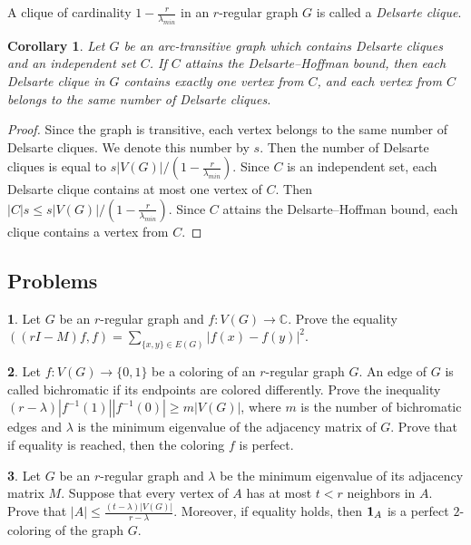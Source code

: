 \documentclass[11pt]{article}
\newtheorem{corollary}{Corollary}[section]
\theoremstyle{definition}
\newtheorem{exercise}{\quad}
\begin{document}
A clique of cardinality $1-\frac{r}{\lambda_{min}}$ in an
$r$-regular graph $G$ is called a {\sl  Delsarte clique}.

\begin{corollary}
Let $G$ be an arc-transitive graph which contains Delsarte cliques and
 an independent set $C$. If  $C$ attains the Delsarte--Hoffman bound,  then each Delsarte clique in $G$ contains exactly one vertex
from $C$, and each vertex from $C$ belongs to the same number
of Delsarte cliques.
\end{corollary}
\begin{proof}
Since the graph is transitive, each vertex belongs to the same
number of Delsarte cliques.
 We denote this number by $s$.  Then
the number of Delsarte cliques is equal to
$s|V(G)|/(1-\frac{r}{\lambda_{min}})$.
 Since $C$ is an independent set, each Delsarte clique contains at most one vertex of $C$.
 Then $|C|s\leq s|V(G)|/(1-\frac{r}{\lambda_{min}})$. Since $C$ attains the Delsarte--Hoffman bound, each clique contains a vertex from $C$.
\end{proof}


\subsection{Problems}



\begin{exercise}
Let $G$ be an $r$-regular graph and $f:V(G)\rightarrow\mathbb{C}$.
Prove the equality $((rI-M)f,f)=\sum\limits_{\{x,y\}\in
E(G)}|f(x)-f(y)|^2$.
\end{exercise}

\begin{exercise}
Let $f:V(G)\rightarrow\{0,1\}$ be a coloring
of an $r$-regular graph $G$. An edge of $G$ is called bichromatic if
its endpoints are colored differently. Prove the inequality 
$(r-\lambda)|f^{-1}(1)||f^{-1}(0)|\geq m|V(G)|$, where $m$ is the number
of bichromatic edges and $\lambda$
is the minimum eigenvalue
of the adjacency matrix of $G$. Prove that if equality is reached, then the coloring $f$ is perfect.
\end{exercise}




\begin{exercise}
{ Let $G$ be an $r$-regular graph and $\lambda$ be the minimum
eigenvalue of its
adjacency matrix $M$.  Suppose that every vertex of $A$ has at most $t<r$ neighbors in $A$. Prove that
$|A|\leq\frac{(t-\lambda)|V(G)|}{r-\lambda}$.  Moreover, if equality holds,  then ${\bf 1}_A$ is a perfect $2$-coloring of the graph $G$. }
\end{exercise}
\end{document}
